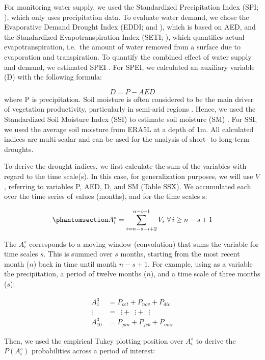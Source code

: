 \documentclass[
  sn-nature,
  numbered]{sn-jnl}
\begin{document}
For monitoring water supply, we used the Standardized Precipitation
Index (SPI; \citep{McKee1993}), which only uses precipitation data. To
evaluate water demand, we chose the Evaporative Demand Drought Index
(EDDI; \citep{Hobbins2016} and \citep{McEvoy2016}), which is based on
AED, and the Standardized Evapotranspiration Index (SETI;
\citep{Yang2019}), which quantifies actual evapotranspiration, i.e.~the
amount of water removed from a surface due to evaporation and
transpiration. To quantify the combined effect of water supply and
demand, we estimated SPEI \citep{Vicente-Serrano2010}. For SPEI, we
calculated an auxiliary variable (D) with the following formula:

\[D = P-AED\] where P is precipitation. Soil moisture is often
considered to be the main driver of vegetation productivity,
particularly in semi-arid regions \citep{Li2022}. Hence, we used the
Standardized Soil Moisture Index (SSI) to estimate soil moisture (SM)
\citep{Hao2013}. For SSI, we used the average soil moisture from ERA5L
at a depth of 1m. All calculated indices are multi-scalar and can be
used for the analysis of short- to long-term droughts.

To derive the drought indices, we first calculate the sum of the
variables with regard to the time scale(s). In this case, for
generalization purposes, we will use \(V\), referring to variables P,
AED, D, and SM (Table SSX). We accumulated each over the time series of
values (months), and for the time scales s:

\begin{equation}\phantomsection\label{eq-sumvar}{A^s_i = \sum_{i=n-s-i+2}^{n-i+1} V_i\,\, \forall\, i\geq n-s+1  }\end{equation}

The \(A^s_i\) corresponds to a moving window (convolution) that sums the
variable for time scales \(s\). This is summed over \(s\) months,
starting from the most recent month (\(n\)) back in time until month
\(n-s+1\). For example, using as a variable the precipitation, a period
of twelve months (\(n\)), and a time scale of three months (\(s\)):

\[
\begin{split}
A^3_1 &= P_{oct} +P_{nov} +P_{dic} \\
\vdots\,\,\, &= \,\,\,\vdots + \,\,\,\vdots + \,\,\,\vdots \\
A^3_{10} &= P_{jan}+P_{feb} +P_{mar}
\end{split}
\]

Then, we used the empirical Tukey plotting position \citep{Wilks2011}
over \(A_i^s\) to derive the \(P(A_i^s)\) probabilities across a period
of interest:
\end{document}
